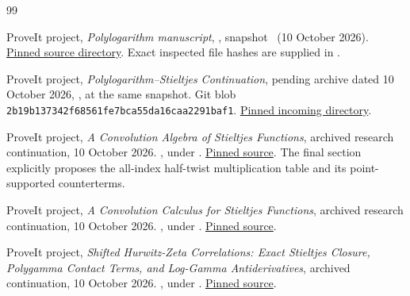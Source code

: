 \begin{thebibliography}{99}
\small\raggedright

ProveIt project,
\emph{Polylogarithm manuscript},
,
snapshot \pinned\ (10 October 2026).
\href{https://github.com/VladimirReshetnikov/ProveIt/tree/e0d9463bdee9685dfb1dddb819059cc738540c57/Analysis/Polylogarithms/docs/manuscript}{Pinned source directory}.
Exact inspected file hashes are supplied in .

ProveIt project,
\emph{Polylogarithm--Stieltjes Continuation},
pending archive dated 10 October 2026,
,
at the same snapshot.
Git blob \texttt{2b19b137342f68561fe7bca55da16caa2291baf1}.
\href{https://github.com/VladimirReshetnikov/ProveIt/tree/e0d9463bdee9685dfb1dddb819059cc738540c57/docs/incoming}{Pinned incoming directory}.

ProveIt project,
\emph{A Convolution Algebra of Stieltjes Functions},
archived research continuation, 10 October 2026.
,
under .
\href{https://github.com/VladimirReshetnikov/ProveIt/blob/e0d9463bdee9685dfb1dddb819059cc738540c57/Analysis/Polylogarithms/docs/reports/stieltjes-correlation-calculus/continuations/convolution-algebra/article.tex}{Pinned source}.
The final section explicitly proposes the all-index half-twist
multiplication table and its point-supported counterterms.

ProveIt project,
\emph{A Convolution Calculus for Stieltjes Functions},
archived research continuation, 10 October 2026.
,
under .
\href{https://github.com/VladimirReshetnikov/ProveIt/blob/e0d9463bdee9685dfb1dddb819059cc738540c57/Analysis/Polylogarithms/docs/reports/stieltjes-correlation-calculus/continuations/convolution-calculus/Stieltjes_Convolution_Calculus.tex}{Pinned source}.

ProveIt project,
\emph{Shifted Hurwitz-Zeta Correlations:
Exact Stieltjes Closure, Polygamma Contact Terms, and Log-Gamma Antiderivatives},
archived continuation, 10 October 2026.
,
under .
\href{https://github.com/VladimirReshetnikov/ProveIt/blob/e0d9463bdee9685dfb1dddb819059cc738540c57/Analysis/Polylogarithms/docs/reports/stieltjes-correlation-calculus/continuations/shifted-hurwitz-jets/sections.tex}{Pinned source}.


\end{thebibliography}
